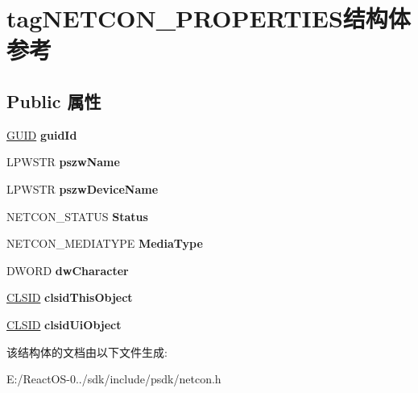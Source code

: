 \hypertarget{structtag_n_e_t_c_o_n___p_r_o_p_e_r_t_i_e_s}{}\section{tag\+N\+E\+T\+C\+O\+N\+\_\+\+P\+R\+O\+P\+E\+R\+T\+I\+E\+S结构体 参考}
\label{structtag_n_e_t_c_o_n___p_r_o_p_e_r_t_i_e_s}
\subsection*{Public 属性}
\begin{DoxyCompactItemize}
\item 
\mbox{\label{structtag_n_e_t_c_o_n___p_r_o_p_e_r_t_i_e_s_a696ca270b622a465ce510f60bca7b08e}} 
\hyperlink{interface_g_u_i_d}{G\+U\+ID} {\bfseries guid\+Id}
\item 
\mbox{\label{structtag_n_e_t_c_o_n___p_r_o_p_e_r_t_i_e_s_a93a50583569294806e782d2e4df681e0}} 
L\+P\+W\+S\+TR {\bfseries pszw\+Name}
\item 
\mbox{\label{structtag_n_e_t_c_o_n___p_r_o_p_e_r_t_i_e_s_a2a539bc3dece7dc4fbf6e8f6adbcbefc}} 
L\+P\+W\+S\+TR {\bfseries pszw\+Device\+Name}
\item 
\mbox{\label{structtag_n_e_t_c_o_n___p_r_o_p_e_r_t_i_e_s_a04b1ac47580230eee50a921dd04ac125}} 
N\+E\+T\+C\+O\+N\+\_\+\+S\+T\+A\+T\+US {\bfseries Status}
\item 
\mbox{\label{structtag_n_e_t_c_o_n___p_r_o_p_e_r_t_i_e_s_aa7d74fd6ae4872b14ecae6493a322abc}} 
N\+E\+T\+C\+O\+N\+\_\+\+M\+E\+D\+I\+A\+T\+Y\+PE {\bfseries Media\+Type}
\item 
\mbox{\label{structtag_n_e_t_c_o_n___p_r_o_p_e_r_t_i_e_s_abe3b2682928973d53c3f9fe73ff694c1}} 
D\+W\+O\+RD {\bfseries dw\+Character}
\item 
\mbox{\label{structtag_n_e_t_c_o_n___p_r_o_p_e_r_t_i_e_s_a9a7f32386941bc3d8a00866b078d0daa}} 
\hyperlink{struct___i_i_d}{C\+L\+S\+ID} {\bfseries clsid\+This\+Object}
\item 
\mbox{\label{structtag_n_e_t_c_o_n___p_r_o_p_e_r_t_i_e_s_a61d34606c930442d83591eb14e70cce2}} 
\hyperlink{struct___i_i_d}{C\+L\+S\+ID} {\bfseries clsid\+Ui\+Object}
\end{DoxyCompactItemize}


该结构体的文档由以下文件生成\+:\begin{DoxyCompactItemize}
\item 
E\+:/\+React\+O\+S-\/0../sdk/include/psdk/netcon.\+h\end{DoxyCompactItemize}
